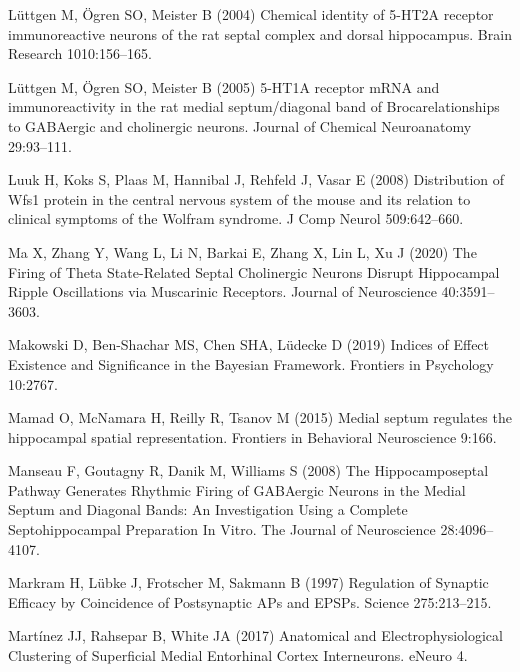 \documentclass[
  12pt,
  a4paper,
  openany]{book}
\newlength{\cslhangindent}
\newlength{\cslentryspacingunit} %
\newenvironment{CSLReferences}[2] %
 {%
  \setlength{\parindent}{0pt}
  \ifodd #1
  \let\oldpar\par
  \def\par{\hangindent=\cslhangindent\oldpar}
  \fi
  \setlength{\parskip}{#2\cslentryspacingunit}
 }%
 {}
\begin{document}
\begin{CSLReferences}{1}{0}
\leavevmode{}%
Lüttgen M, Ögren SO, Meister B (2004) Chemical identity of 5-{HT2A} receptor immunoreactive neurons of the rat septal complex and dorsal hippocampus. Brain Research 1010:156--165.

\leavevmode{}%
Lüttgen M, Ögren SO, Meister B (2005) 5-{HT1A} receptor {mRNA} and immunoreactivity in the rat medial septum/diagonal band of {Broca}{\textemdash}relationships to {GABAergic} and cholinergic neurons. Journal of Chemical Neuroanatomy 29:93--111.

\leavevmode{}%
Luuk H, Koks S, Plaas M, Hannibal J, Rehfeld J, Vasar E (2008) Distribution of {Wfs1} protein in the central nervous system of the mouse and its relation to clinical symptoms of the {Wolfram} syndrome. J Comp Neurol 509:642--660.

\leavevmode{}%
Ma X, Zhang Y, Wang L, Li N, Barkai E, Zhang X, Lin L, Xu J (2020) The {Firing} of {Theta} {State}-{Related} {Septal} {Cholinergic} {Neurons} {Disrupt} {Hippocampal} {Ripple} {Oscillations} via {Muscarinic} {Receptors}. Journal of Neuroscience 40:3591--3603.

\leavevmode{}%
Makowski D, Ben-Shachar MS, Chen SHA, Lüdecke D (2019) Indices of {Effect} {Existence} and {Significance} in the {Bayesian} {Framework}. Frontiers in Psychology 10:2767.

\leavevmode{}%
Mamad O, McNamara H, Reilly R, Tsanov M (2015) Medial septum regulates the hippocampal spatial representation. Frontiers in Behavioral Neuroscience 9:166.

\leavevmode{}%
Manseau F, Goutagny R, Danik M, Williams S (2008) The {Hippocamposeptal} {Pathway} {Generates} {Rhythmic} {Firing} of {GABAergic} {Neurons} in the {Medial} {Septum} and {Diagonal} {Bands}: {An} {Investigation} {Using} a {Complete} {Septohippocampal} {Preparation} {In} {Vitro}. The Journal of Neuroscience 28:4096--4107.

\leavevmode{}%
Markram H, Lübke J, Frotscher M, Sakmann B (1997) Regulation of {Synaptic} {Efficacy} by {Coincidence} of {Postsynaptic} {APs} and {EPSPs}. Science 275:213--215.

\leavevmode{}%
Martínez JJ, Rahsepar B, White JA (2017) Anatomical and {Electrophysiological} {Clustering} of {Superficial} {Medial} {Entorhinal} {Cortex} {Interneurons}. eNeuro 4.


\end{CSLReferences}
\end{document}
